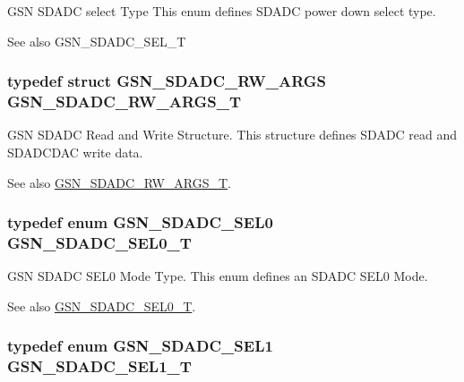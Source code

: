 GSN SDADC select Type This enum defines SDADC power down select type. 

\begin{DoxySeeAlso}{See also}
GSN\_\-SDADC\_\-SEL\_\-T 
\end{DoxySeeAlso}
\hypertarget{a00652_ga9a25b59de94ab9eb590861d864697679}{
\subsubsection[{GSN\_\-SDADC\_\-RW\_\-ARGS\_\-T}]{\setlength{\rightskip}{0pt plus 5cm}typedef struct {\bf GSN\_\-SDADC\_\-RW\_\-ARGS}  {\bf GSN\_\-SDADC\_\-RW\_\-ARGS\_\-T}}}
\label{a00652_ga9a25b59de94ab9eb590861d864697679}


GSN SDADC Read and Write Structure. This structure defines SDADC read and SDADCDAC write data. 

\begin{DoxySeeAlso}{See also}
\hyperlink{a00652_ga9a25b59de94ab9eb590861d864697679}{GSN\_\-SDADC\_\-RW\_\-ARGS\_\-T}. 
\end{DoxySeeAlso}
\hypertarget{a00652_ga1211f3eac3c8c6697324a356da4dbcb7}{
\subsubsection[{GSN\_\-SDADC\_\-SEL0\_\-T}]{\setlength{\rightskip}{0pt plus 5cm}typedef enum {\bf GSN\_\-SDADC\_\-SEL0}  {\bf GSN\_\-SDADC\_\-SEL0\_\-T}}}
\label{a00652_ga1211f3eac3c8c6697324a356da4dbcb7}


GSN SDADC SEL0 Mode Type. This enum defines an SDADC SEL0 Mode. 

\begin{DoxySeeAlso}{See also}
\hyperlink{a00652_ga1211f3eac3c8c6697324a356da4dbcb7}{GSN\_\-SDADC\_\-SEL0\_\-T}. 
\end{DoxySeeAlso}
\hypertarget{a00652_ga851e1269993bbdc128b392fd7216ade7}{
\subsubsection[{GSN\_\-SDADC\_\-SEL1\_\-T}]{\setlength{\rightskip}{0pt plus 5cm}typedef enum {\bf GSN\_\-SDADC\_\-SEL1}  {\bf GSN\_\-SDADC\_\-SEL1\_\-T}}}
\label{a00652_ga851e1269993bbdc128b392fd7216ade7}


